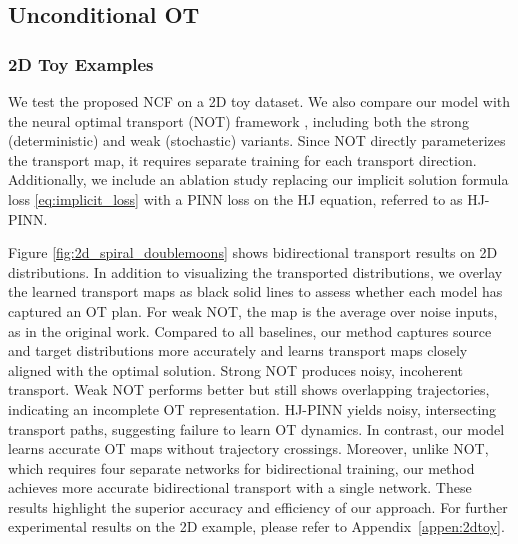\documentclass{article} %
\theoremstyle{plain}
\theoremstyle{definition}
\theoremstyle{remark}
\begin{document}
\vspace{-0.1cm}

\subsection{Unconditional OT}\vspace{-0.2em}
\subsubsection{2D Toy Examples}\label{sec:2D_unconditional}
\vspace{-0.5em}
We test the proposed NCF on a 2D toy dataset. We also compare our model with the neural optimal transport (NOT) framework \citep{korotin2022neural}, including both the strong (deterministic) and weak (stochastic) variants. Since NOT directly parameterizes the transport map, it requires separate training for each transport direction. Additionally, we include an ablation study replacing our implicit solution formula loss \eqref{eq:implicit_loss} with a PINN loss on the HJ equation, referred to as HJ-PINN.

Figure \ref{fig:2d_spiral_doublemoons}  shows bidirectional transport results on 2D distributions. 
In addition to visualizing the transported distributions, we overlay the learned transport maps as black solid lines to assess whether each model has captured an OT plan.
For weak NOT, the map is the average over noise inputs, as in the original work.
Compared to all baselines, our method captures source and target distributions more accurately and learns transport maps closely aligned with the optimal solution. Strong NOT produces noisy, incoherent transport. Weak NOT performs better but still shows overlapping trajectories, indicating an incomplete OT representation. HJ-PINN yields noisy, intersecting transport paths, suggesting failure to learn OT dynamics. In contrast, our model learns accurate OT maps without trajectory crossings. Moreover, unlike NOT, which requires four separate networks for bidirectional training, our method achieves more accurate bidirectional transport with a single network. These results highlight the superior accuracy and efficiency of our approach. 
For further experimental results on the 2D example, please refer to Appendix~\ref{appen:2dtoy}.
\end{document}
